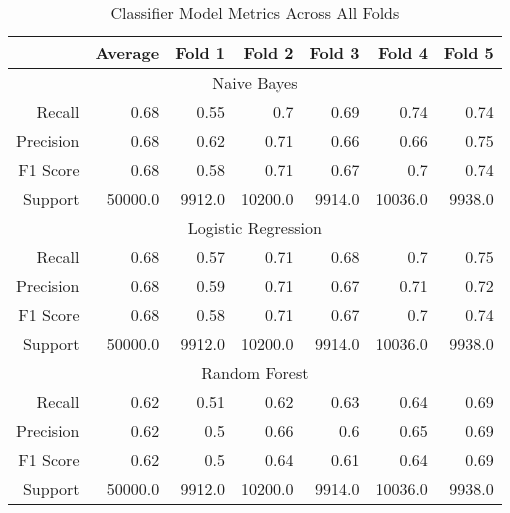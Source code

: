 \begin{table}[h]
    \centering
    \begin{tabular}{r|r|r|r|r|r|r}
        & Average & Fold 1 & Fold 2 & Fold 3 & Fold 4 & Fold 5 \\\hline
        \multicolumn{7}{c}{Naive Bayes} \\\hline
        Recall      & 0.68 & 0.55 & 0.7 & 0.69 & 0.74 & 0.74 \\
        Precision   & 0.68 & 0.62 & 0.71 & 0.66 & 0.66 & 0.75 \\
        F1 Score    & 0.68 & 0.58 & 0.71 & 0.67 & 0.7 & 0.74 \\
        Support     & 50000.0 & 9912.0 & 10200.0 & 9914.0 & 10036.0 & 9938.0 \\\hline
        \multicolumn{7}{c}{Logistic Regression} \\\hline
        Recall      & 0.68 & 0.57 & 0.71 & 0.68 & 0.7 & 0.75 \\
        Precision   & 0.68 & 0.59 & 0.71 & 0.67 & 0.71 & 0.72 \\
        F1 Score    & 0.68 & 0.58 & 0.71 & 0.67 & 0.7 & 0.74 \\
        Support     & 50000.0 & 9912.0 & 10200.0 & 9914.0 & 10036.0 & 9938.0 \\\hline
        \multicolumn{7}{c}{Random Forest} \\\hline
        Recall      & 0.62 & 0.51 & 0.62 & 0.63 & 0.64 & 0.69 \\
        Precision   & 0.62 & 0.5 & 0.66 & 0.6 & 0.65 & 0.69 \\
        F1 Score    & 0.62 & 0.5 & 0.64 & 0.61 & 0.64 & 0.69 \\
        Support     & 50000.0 & 9912.0 & 10200.0 & 9914.0 & 10036.0 & 9938.0 \\\hline
    \end{tabular}
    \caption{Classifier Model Metrics Across All Folds}
    \label{tab:combined_fold_metrics}
\end{table}